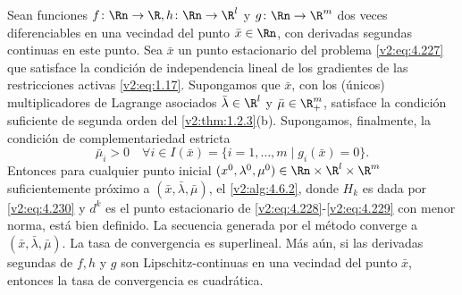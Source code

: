 \begin{theorem}\label{v2:thm:4.6.1}
Sean funciones $f \colon \Rn \to \R, h \colon \Rn \to \R^l$ y $g \colon \Rn \to \R^m$ dos veces diferenciables en una vecindad del punto $\bar{x} \in \Rn$, con derivadas segundas continuas en este punto. Sea $\bar{x}$ un punto estacionario del problema \eqref{v2:eq:4.227} que satisface la condición de independencia lineal de los gradientes de las restricciones activas \eqref{v2:eq:1.17}. Supongamos que $\bar{x}$, con los (únicos) multiplicadores de Lagrange asociados $\bar{\lambda} \in \R^l$ y $\bar{\mu} \in \R^m_+$, satisface la condición suficiente de segunda orden del \cref{v2:thm:1.2.3}(b). Supongamos, finalmente, la condición de complementariedad estricta
\begin{equation}
\bar{\mu}_i > 0 \quad \forall i \in I(\bar{x}) = \{ i = 1, \dots, m \mid g_i(\bar{x}) = 0 \}.
\label{v2:eq:4.231}
\end{equation}
Entonces para cualquier punto inicial $(x^0, \lambda^0, \mu^0) \in \Rn \times \R^l \times \R^m$ suficientemente próximo a $(\bar{x}, \bar{\lambda}, \bar{\mu})$, el \cref{v2:alg:4.6.2}, donde $H_k$ es dada por \eqref{v2:eq:4.230} y $d^k$ es el punto estacionario de \eqref{v2:eq:4.228}-\eqref{v2:eq:4.229} con menor norma, está bien definido. La secuencia generada por el método converge a $(\bar{x}, \bar{\lambda}, \bar{\mu})$. La tasa de convergencia es superlineal. Más aún, si las derivadas segundas de $f, h$ y $g$ son Lipschitz-continuas en una vecindad del punto $\bar{x}$, entonces la tasa de convergencia es cuadrática.
\end{theorem}

